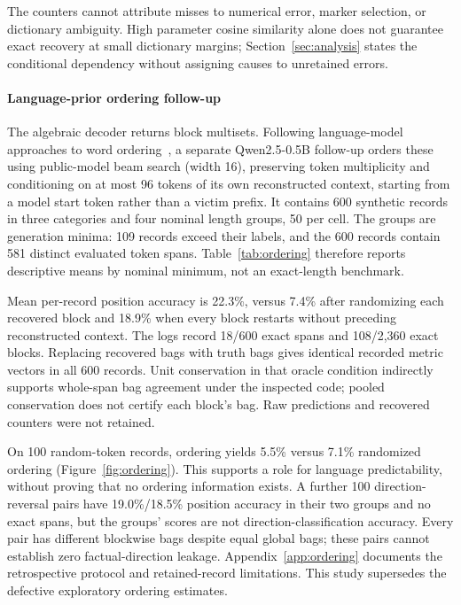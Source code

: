 The counters cannot attribute misses to numerical error, marker selection, or dictionary ambiguity. High parameter cosine similarity alone does not guarantee exact recovery at small dictionary margins; Section~\ref{sec:analysis} states the conditional dependency without assigning causes to unretained errors.

\paragraph{Language-prior ordering follow-up}
\label{sec:ordering}
The algebraic decoder returns block multisets. Following language-model approaches to word ordering~\cite{wordorder,ibis}, a separate Qwen2.5-0.5B follow-up orders these using public-model beam search (width 16), preserving token multiplicity and conditioning on at most 96 tokens of its own reconstructed context, starting from a model start token rather than a victim prefix. It contains 600 synthetic records in three categories and four nominal length groups, 50 per cell. The groups are generation minima: 109 records exceed their labels, and the 600 records contain 581 distinct evaluated token spans. Table~\ref{tab:ordering} therefore reports descriptive means by nominal minimum, not an exact-length benchmark.

\begin{table}[t]
\centering
\caption{Ordering follow-up: mean position accuracy (\%) by nominal generation minimum, with 50 records per cell. Actual spans exceed the minimum in 109/600 records.}
\label{tab:ordering}

\end{table}

Mean per-record position accuracy is 22.3\%, versus 7.4\% after randomizing each recovered block and 18.9\% when every block restarts without preceding reconstructed context. The logs record 18/600 exact spans and 108/2,360 exact blocks. Replacing recovered bags with truth bags gives identical recorded metric vectors in all 600 records. Unit conservation in that oracle condition indirectly supports whole-span bag agreement under the inspected code; pooled conservation does not certify each block's bag. Raw predictions and recovered counters were not retained.

On 100 random-token records, ordering yields 5.5\% versus 7.1\% randomized ordering (Figure~\ref{fig:ordering}). This supports a role for language predictability, without proving that no ordering information exists. A further 100 direction-reversal pairs have 19.0\%/18.5\% position accuracy in their two groups and no exact spans, but the groups' scores are not direction-classification accuracy. Every pair has different blockwise bags despite equal global bags; these pairs cannot establish zero factual-direction leakage. Appendix~\ref{app:ordering} documents the retrospective protocol and retained-record limitations. This study supersedes the defective exploratory ordering estimates.

